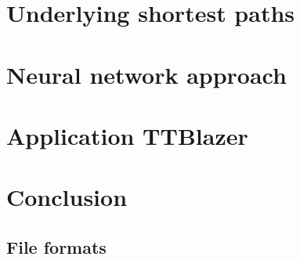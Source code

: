 \documentclass[a4paper]{article}
\numberwithin{algorithm}{section}
\numberwithin{figure}{section}
\numberwithin{table}{section}
\numberwithin{equation}{section}
\begin{document}
    \section{Underlying shortest paths}
    \label{sec:usp}
    \pagebreak
    
    \section{Neural network approach}
    \label{sec:neural}
    \pagebreak
    
    \section{Application TTBlazer}
    \label{sec:ttblazer}
    
    \pagebreak

    \section{Conclusion}
    \label{sec:concl}
    \pagebreak
    
    \begin{appendices}
  		\section{File formats}
  		\label{app:formats}
	\end{appendices}
	\pagebreak



    
    {}
\end{document}

